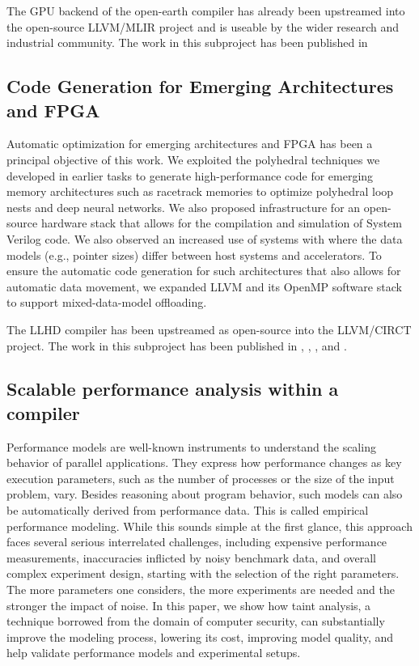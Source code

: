 \documentclass[11pt, manuscript,\review anonymous]{acmart}
\begin{document}
The GPU backend of the open-earth compiler has already been upstreamed into
the open-source LLVM/MLIR project and is useable by the wider research
and industrial community. The work in this subproject has been published in \citet{gysi2020ooc}


\subsection{Code Generation for Emerging Architectures and FPGA}

Automatic optimization for emerging architectures and FPGA has been a principal
objective of this work. We exploited the polyhedral techniques we developed in
earlier tasks to generate high-performance code for emerging memory
architectures such as racetrack memories to optimize polyhedral loop nests and
deep neural networks. We also proposed infrastructure for an open-source
hardware stack that allows for the compilation and simulation of System Verilog
code. We also observed an increased use of systems with where the data models
(e.g., pointer sizes) differ between host systems and accelerators. To ensure
the automatic code generation for such architectures that also allows for
automatic data movement, we expanded LLVM and its OpenMP software stack to
support mixed-data-model offloading.

The LLHD compiler has been upstreamed as open-source into the LLVM/CIRCT
project. The work in this subproject has been published in \citet{khan2020polyhedral},
\citet{schueki2020llhd}, \citet{kurth2020mixed}, and \citet{kourtis2020compiling}.

\subsection{Scalable performance analysis within a compiler}

Performance models are well-known instruments to understand the scaling
behavior of parallel applications. They express how performance changes as key
execution parameters, such as the number of processes or the size of the input
problem, vary. Besides reasoning about program behavior, such models can also
be automatically derived from performance data. This is called empirical
performance modeling. While this sounds simple at the first glance, this
approach faces several serious interrelated challenges, including expensive
performance measurements, inaccuracies inflicted by noisy benchmark data, and
overall complex experiment design, starting with the selection of the right
parameters. The more parameters one considers, the more experiments are needed
and the stronger the impact of noise. In this paper, we show how taint
analysis, a technique borrowed from the domain of computer security, can
substantially improve the modeling process, lowering its cost, improving model
quality, and help validate performance models and experimental setups.
\end{document}
